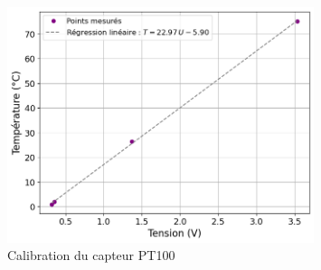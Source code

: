 \begin{figure}[H]
    \centering
    \includegraphics[width=0.8\textwidth]{assets/figures/CalibrationPT100.png}
    \caption{Calibration du capteur PT100}
    \label{fig:CalibrationPT100}
\end{figure}


